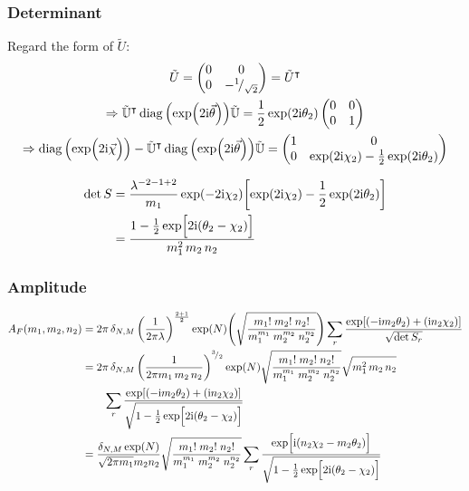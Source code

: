 \documentclass[
	english,
	a4paper,
	fontsize=10pt,
	parskip=half,
	titlepage=true,
	DIV=12,
	final
]{scrreprt}
\newcommand*{\Thus}{\ensuremath{\Rightarrow}\xspace}
\newcommand*{\smallfrac}  [2]{\ensuremath{{}^        {#1} \!/_        {#2}}}
\newcommand*{\transp}{\ensuremath{^\intercal}}
\newcommand*{\iunit}{\ensuremath{\mathrm{i}}}
\DeclareMathOperator{\diag}{diag}
\begin{document}
\subsubsection{Determinant}
Regard the form of $\tilde{U}$:
\begin{gather}
	\tilde{U}
=
	\begin{pmatrix}
		0 & 0 \\ 0 & -\smallfrac{1}{\sqrt{2}}
	\end{pmatrix}
=
	\tilde{U}\transp
\\
	\Thus
	\tilde{\mathbb{U}}\transp
	\diag\qty(\exp(2\iunit\vec{\theta}))
	\tilde{\mathbb{U}}
=
	\frac{1}{2} \exp(2\iunit \theta_2)
	\begin{pmatrix}
		0 & 0 \\ 0 & 1
	\end{pmatrix}
\\
	\Thus
	\diag\qty( \exp(\Big.2\iunit\vec{\chi}) )
	-
	\tilde{\mathbb{U}}\transp
	\diag\qty(\exp(2\iunit\vec{\theta}))
	\tilde{\mathbb{U}}
=
	\begin{pmatrix}
		1 & 0 \\
		0 & \exp(2\iunit \chi_2) - \frac{1}{2} \exp(2\iunit \theta_2)
	\end{pmatrix}	
\end{gather}

\begin{align}
	\det S
&=
	\frac{ \lambda^{-2 - 1 + 2} }{ m_1 }
	\exp(-2\iunit \chi_2)
	\qty[ 
		\exp(2\iunit \chi_2) - \frac{1}{2} \exp(2\iunit \theta_2)
	] \\
&=
	\frac
		{1 - \frac{1}{2} \exp[\Big. 2\iunit (\theta_2 - \chi_2)]}
		{m_1^2 \, m_2 \, n_2}
\end{align}

\subsubsection{Amplitude}
\begin{align}
	A_F(m_1, m_2, n_2)
&=
	2\pi \, \delta_{N,M} \, \qty(
		\frac{1}{2\pi\lambda}
	)^{\frac{2 + 1}{2}}
	\exp(N)
	\qty(
		\sqrt{\frac
			{ m_1!      \; m_2!     \; n_2! }
			{ m_1^{m_1} \;m_2^{m_2} \; n_2^{n_2} }
	})
	\sum_r
		\frac
		{\exp[
			\qty(- \iunit m_2 \theta_2) + 
			\qty(  \iunit n_2 \chi  _2)
		]}
		{\sqrt{\det S_r}}
	\\
&=
\nonumber
	2\pi \, \delta_{N,M} \, \qty(
		\frac{1}{2\pi m_1 \, m_2 \, n_2}
	)^{\smallfrac{3}{2}}
	\exp(N)
	\sqrt{\frac
		{ m_1!      \; m_2!     \; n_2! }
		{ m_1^{m_1} \;m_2^{m_2} \; n_2^{n_2} }
	}
	\sqrt{m_1^2 \, m_2 \, n_2}
\\ &\qquad
	\sum_r
		\frac
		{\exp[
			\qty(- \iunit m_2 \theta_2) + 
			\qty(  \iunit n_2 \chi  _2)
		]}
		{\sqrt{1 - \frac{1}{2} \exp[\Big. 2\iunit (\theta_2 - \chi_2)]}}
	\\
&=
	\frac
		{\delta_{N,M} \exp(N)}
		{\sqrt{2\pi m_1} m_2 n_2}
	\sqrt{\frac
		{ m_1!      \; m_2!     \; n_2! }
		{ m_1^{m_1} \;m_2^{m_2} \; n_2^{n_2} }
	}
	\sum_r \frac
		{\exp[ \Big. \iunit
			\qty( n_2 \chi_2 - m_2 \theta_2 )
		]}
		{\sqrt{1 - \frac{1}{2} \exp[\Big. 2\iunit (\theta_2 - \chi_2)]}}
\end{align}
\end{document}
